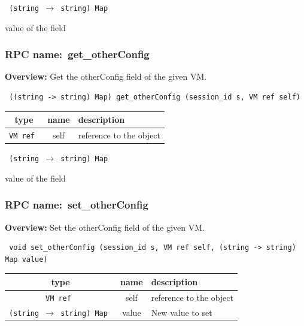 \vspace{0.3cm}

{\tt 
(string $\rightarrow$ string) Map
}


value of the field
\vspace{0.3cm}
\vspace{0.3cm}
\vspace{0.3cm}
\subsubsection{RPC name:~get\_otherConfig}

{\bf Overview:} 
Get the otherConfig field of the given VM.

\begin{verbatim} ((string -> string) Map) get_otherConfig (session_id s, VM ref self)\end{verbatim}



 
\vspace{0.3cm}
\begin{tabular}{|c|c|p{7cm}|}
 \hline
{\bf type} & {\bf name} & {\bf description} \\ \hline
{\tt VM ref } & self & reference to the object \\ \hline 

\end{tabular}

\vspace{0.3cm}

{\tt 
(string $\rightarrow$ string) Map
}


value of the field
\vspace{0.3cm}
\vspace{0.3cm}
\vspace{0.3cm}
\subsubsection{RPC name:~set\_otherConfig}

{\bf Overview:} 
Set the otherConfig field of the given VM.

\begin{verbatim} void set_otherConfig (session_id s, VM ref self, (string -> string) Map value)\end{verbatim}



 
\vspace{0.3cm}
\begin{tabular}{|c|c|p{7cm}|}
 \hline
{\bf type} & {\bf name} & {\bf description} \\ \hline
{\tt VM ref } & self & reference to the object \\ \hline 

{\tt (string $\rightarrow$ string) Map } & value & New value to set \\ \hline 

\end{tabular}

